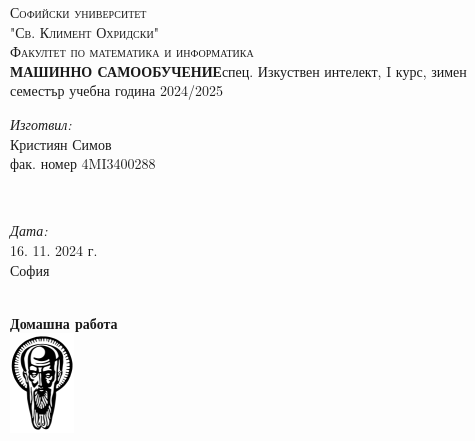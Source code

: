 \documentclass[12pt]{article}
\begin{document}
	\begin{titlepage}	
		\newcommand{\HRule}{\rule{\linewidth}{0.5mm}} %
		\begin{center}
		\textsc{\LARGE Софийски университет }\\[0.3cm]
		\textsc{\LARGE "Св. Климент Охридски" }\\[0.3cm]
		\textsc{\Large Факултет по математика и информатика }\\[0.2cm]
		
		{\fontsize{12}{18}\selectfont \bf МАШИННО САМООБУЧЕНИЕ}\vspace{15pt}\newline спец. Изкуствен интелект, I курс, зимен семестър \newline учебна година 2024/2025
		\vspace{30pt}
		
		
		
		
		
		\begin{minipage}{0.4\textwidth}
			\begin{flushleft}\large
				\emph{Изготвил:} \\
				Кристиян Симов \\ 
				фак. номер 4MI3400288
			\end{flushleft}
		\end{minipage}
		~
		\begin{minipage}{0.4\textwidth}
			\begin{flushright}
				\large
				\emph{Дата:}\\
				16. 11. 2024 г. %
				\\София 
			\end{flushright}
		\end{minipage}\\[1cm]
		\bigskip
		{\large \textbf{Домашна работа }}\\[1cm] %
		\includegraphics{logo_su_no_text.png}\\[1cm]
		\vfill %
		\end{center}
	\end{titlepage}
	
\end{document}
